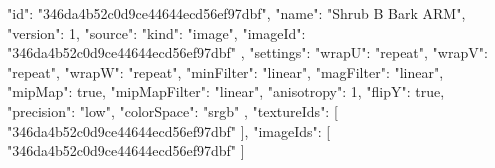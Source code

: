 {
  "id": "346da4b52c0d9ce44644ecd56ef97dbf",
  "name": "Shrub B Bark ARM",
  "version": 1,
  "source": {
    "kind": "image",
    "imageId": "346da4b52c0d9ce44644ecd56ef97dbf"
  },
  "settings": {
    "wrapU": "repeat",
    "wrapV": "repeat",
    "wrapW": "repeat",
    "minFilter": "linear",
    "magFilter": "linear",
    "mipMap": true,
    "mipMapFilter": "linear",
    "anisotropy": 1,
    "flipY": true,
    "precision": "low",
    "colorSpace": "srgb"
  },
  "textureIds": [
    "346da4b52c0d9ce44644ecd56ef97dbf"
  ],
  "imageIds": [
    "346da4b52c0d9ce44644ecd56ef97dbf"
  ]
}
